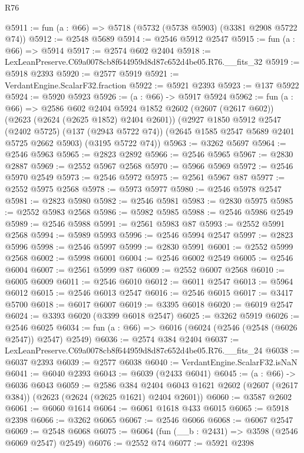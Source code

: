 \begin{lexlean}{R76}
\begin{coremodule}
@5911 := fun (a : @66) => @5718 (@5732 (@5738 @5903) (@3381 @2908 @5722 @74))
@5912 := @2548 @5689
@5914 := @2546 @5912 @2547
@5915 := fun (a : @66) => @5914
@5917 := @2574 @602 @2404
@5918 := LexLeanPreserve.C69a0078cb8f644959d8d87c652d4be05.R76.__fits_32
@5919 := @5918 @2393
@5920 := @2577 @5919
@5921 := VerdantEngine.ScalarF32.fraction
@5922 := @5921 @2393
@5923 := @137 @5922
@5924 := @5920 @5923
@5926 := (a : @66) -> @5917 @5924
@5962 := fun (a : @66) =>
  @2586
    @602
    @2404
    @5924
    @1852
    @2602
    (@2607 (@2617 @602))
    (@2623 (@2624 (@2625 @1852) @2404 @2601))
    (@2927
      @1850
      @5912
      @2547
      (@2402 @5725)
      (@137 (@2943 @5722 @74))
      (@2645 @1585 @2547 @5689 @2401 @5725 @2662 @5903)
      (@3195 @5722 @74))
@5963 := @3262 @5697
@5964 := @2546 @5963
@5965 := @2823 @2892
@5966 := @2546 @5965
@5967 := @2830 @2887
@5969 := @2552 @5967 @2568
@5970 := @5966 @5969
@5972 := @2546 @5970 @2549
@5973 := @2546 @5972
@5975 := @2561 @5967 @87
@5977 := @2552 @5975 @2568
@5978 := @5973 @5977
@5980 := @2546 @5978 @2547
@5981 := @2823 @5980
@5982 := @2546 @5981
@5983 := @2830 @5975
@5985 := @2552 @5983 @2568
@5986 := @5982 @5985
@5988 := @2546 @5986 @2549
@5989 := @2546 @5988
@5991 := @2561 @5983 @87
@5993 := @2552 @5991 @2568
@5994 := @5989 @5993
@5996 := @2546 @5994 @2547
@5997 := @2823 @5996
@5998 := @2546 @5997
@5999 := @2830 @5991
@6001 := @2552 @5999 @2568
@6002 := @5998 @6001
@6004 := @2546 @6002 @2549
@6005 := @2546 @6004
@6007 := @2561 @5999 @87
@6009 := @2552 @6007 @2568
@6010 := @6005 @6009
@6011 := @2546 @6010
@6012 := @6011 @2547
@6013 := @5964 @6012
@6015 := @2546 @6013 @2547
@6016 := @2546 @6015
@6017 := @3417 @5700
@6018 := @6017 @6007
@6019 := @3395 @6018
@6020 := @6019 @2547
@6024 := @3393 @6020 (@3399 @6018 @2547)
@6025 := @3262 @5919
@6026 := @2546 @6025
@6034 := fun (a : @66) => @6016 (@6024 (@2546 (@2548 (@6026 @2547)) @2547) @2549)
@6036 := @2574 @384 @2404
@6037 := LexLeanPreserve.C69a0078cb8f644959d8d87c652d4be05.R76.__fits_24
@6038 := @6037 @2393
@6039 := @2577 @6038
@6040 := VerdantEngine.ScalarF32.isNaN
@6041 := @6040 @2393
@6043 := @6039 (@2433 @6041)
@6045 := (a : @66) -> @6036 @6043
@6059 := @2586
    @384
    @2404
    @6043
    @1621
    @2602
    (@2607 (@2617 @384))
    (@2623 (@2624 (@2625 @1621) @2404 @2601))
@6060 := @3587 @2602
@6061 := @6060 @1614
@6064 := @6061 @1618 @433 @6015
@6065 := @5918 @2398
@6066 := @3262 @6065
@6067 := @2546 @6066
@6068 := @6067 @2547
@6069 := @2548 @6068
@6075 := @6064 (fun (__b : @2431) => @3598 (@2546 @6069 @2547) @2549)
@6076 := @2552 @74
@6077 := @5921 @2398

\end{coremodule}
\end{lexlean}

